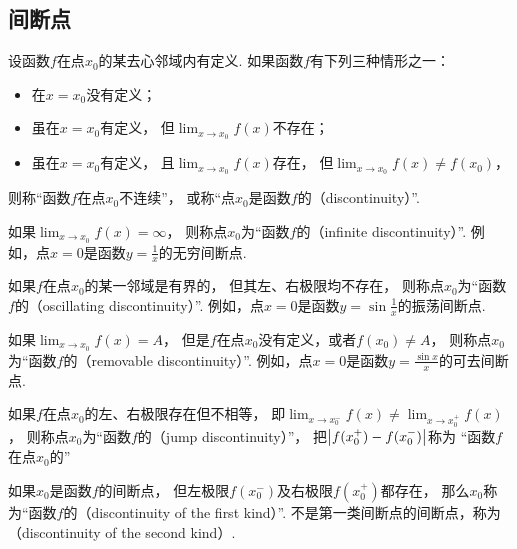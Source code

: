 \subsection{间断点}
\begin{definition}
设函数\(f\)在点\(x_0\)的某去心邻域内有定义.
如果函数\(f\)有下列三种情形之一：
\begin{itemize}
	\item 在\(x=x_0\)没有定义；
	\item 虽在\(x=x_0\)有定义，
	但\(\lim_{x \to x_0} f(x)\)不存在；
	\item 虽在\(x=x_0\)有定义，
	且\(\lim_{x \to x_0} f(x)\)存在，
	但\(\lim_{x \to x_0} f(x) \neq f(x_0)\)，
\end{itemize}
则称“函数\(f\)在点\(x_0\)不连续”，
或称“点\(x_0\)是函数\(f\)的（discontinuity）”.
\end{definition}

如果\(\lim_{x \to x_0} f(x) = \infty\)，
则称点\(x_0\)为“函数\(f\)的（infinite discontinuity）”.
例如，点\(x=0\)是函数\(y=\frac{1}{x}\)的无穷间断点.

如果\(f\)在点\(x_0\)的某一邻域是有界的，
但其左、右极限均不存在，
则称点\(x_0\)为“函数\(f\)的（oscillating discontinuity）”.
例如，点\(x=0\)是函数\(y=\sin\frac{1}{x}\)的振荡间断点.

如果\(\lim_{x \to x_0} f(x) = A\)，
但是\(f\)在点\(x_0\)没有定义，或者\(f(x_0) \neq A\)，
则称点\(x_0\)为“函数\(f\)的（removable discontinuity）”.
例如，点\(x=0\)是函数\(y=\frac{\sin x}{x}\)的可去间断点.

如果\(f\)在点\(x_0\)的左、右极限存在但不相等，
即\(\lim_{x \to x_0^-} f(x) \neq \lim_{x \to x_0^+} f(x)\)，
则称点\(x_0\)为“函数\(f\)的（jump discontinuity）”，
把\(\abs{f(x_0^+)-f(x_0^-)}\)称为
“函数\(f\)在点\(x_0\)的”

如果\(x_0\)是函数\(f\)的间断点，
但左极限\(f(x_0^-)\)及右极限\(f(x_0^+)\)都存在，
那么\(x_0\)称为“函数\(f\)的（discontinuity of the first kind）”.
不是第一类间断点的间断点，称为（discontinuity of the second kind）.

